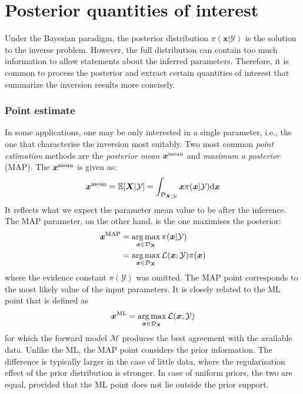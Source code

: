\section{Posterior quantities of interest}
Under the Bayesian paradigm, the posterior distribution $\pi(\boldsymbol{x}|\mathcal{Y})$ is the solution to the inverse problem. However, the full distribution can contain too much information to allow statements about the inferred parameters. Therefore, it is common to process the posterior and extract certain quantities of interest that summarize the inversion results more concisely.

\subsubsection{Point estimate}

In some applications, one may be only interested in a single parameter, i.e., the one that characterise the inversion most suitably. Two most common \textit{point estimation} methods are the \textit{posterior mean} $\boldsymbol{x}^{\rm{mean}}$ and \textit{maximum a posterior} (\acrshort{MAP}). The $\boldsymbol{x}^{\rm{mean}}$ is given as:
\begin{equation}
    \label{eq: posterior mean}
    \boldsymbol{x}^{\rm{mean}} = \mathbb{E}[\boldsymbol{X}|\mathcal{Y}] = \int_{\mathcal{D}_{\boldsymbol{X}|\mathcal{Y}}} 
    \boldsymbol{x} \pi(\boldsymbol{x}|\mathcal{Y}) {\rm{d}} \boldsymbol{x}  
\end{equation}
It reflects what we expect the parameter mean value to be after the inference. The \acrshort{MAP} parameter, on the other hand, is the one maximises the posterior:
\begin{equation}
    \label{eq: MAP}
    \begin{aligned}
       \boldsymbol{x}^{\rm{MAP}} &= \mathop{\arg\max}\limits_{\boldsymbol{x} \in \mathcal{D}_{\boldsymbol{X}}}
    \pi(\boldsymbol{x}|\mathcal{Y}) \\
    &=\mathop{\arg\max}\limits_{\boldsymbol{x} \in \mathcal{D}_{\boldsymbol{X}}}
   {\mathcal{L}(\boldsymbol{x};\mathcal{Y}) \pi(\boldsymbol{x})}     
    \end{aligned}
\end{equation}
where the evidence constant $\pi(\mathcal{Y})$ was omitted. The \acrshort{MAP} point corresponds to the most likely value of the input parameters. It is closely related to the \acrfull{ML} point that is defined as 
\begin{equation}
    \label{eq: MLE}
    \boldsymbol{x}^{\rm{ML}}  = \mathop{\arg\max}\limits_{\boldsymbol{x} \in \mathcal{D}_{\boldsymbol{X}}}
   {\mathcal{L}(\boldsymbol{x};\mathcal{Y})}
\end{equation}
for which the forward model $\mathcal{M}$ produces the best agreement with the available data. Unlike the \acrshort{ML}, the \acrshort{MAP} point considers the prior information. The difference is typically larger in the case of little data, where the regularisation effect of the prior distribution is stronger. In case of uniform priors, the two are equal, provided that the \acrshort{ML} point does not lie outside the prior support.

